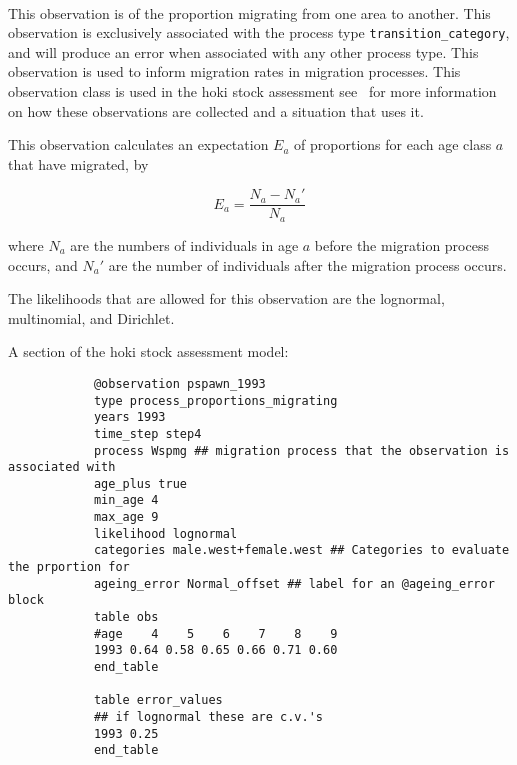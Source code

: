 \begin{itemize}
	
	\paragraph*{\label{sec:Proportions-migrating}}\label{sec:Observation-ProportionsMigrating}
	
	This observation is of the proportion migrating from one area to another. This observation is exclusively associated with the process type \texttt{transition\_category}, and will produce an error when associated with any other process type. This observation is used to inform migration rates in migration processes. This observation class is used in the hoki stock assessment see~\cite{francis_03} for more information on how these observations are collected and a situation that uses it.
	
	This observation calculates an expectation $E_a$ of proportions for each age class $a$ that have migrated, by
	
	\begin{equation}
	E_a = \frac{N_a - N_a'}{N_a}
	\end{equation}
	
	where $N_a$ are the numbers of individuals in age $a$ before the migration process occurs, and $N_a'$ are the number of individuals after the migration process occurs.
	
	The likelihoods that are allowed for this observation are the lognormal, multinomial, and Dirichlet.
	
	A section of the hoki stock assessment model:
	
	{\small{\begin{verbatim}
			@observation pspawn_1993
			type process_proportions_migrating
			years 1993
			time_step step4
			process Wspmg ## migration process that the observation is associated with
			age_plus true
			min_age 4
			max_age 9
			likelihood lognormal
			categories male.west+female.west ## Categories to evaluate the prportion for
			ageing_error Normal_offset ## label for an @ageing_error block
			table obs
			#age    4    5    6    7    8    9
			1993 0.64 0.58 0.65 0.66 0.71 0.60
			end_table
			
			table error_values
			## if lognormal these are c.v.'s
			1993 0.25
			end_table
			\end{verbatim}}}
	
\end{itemize}
\else
